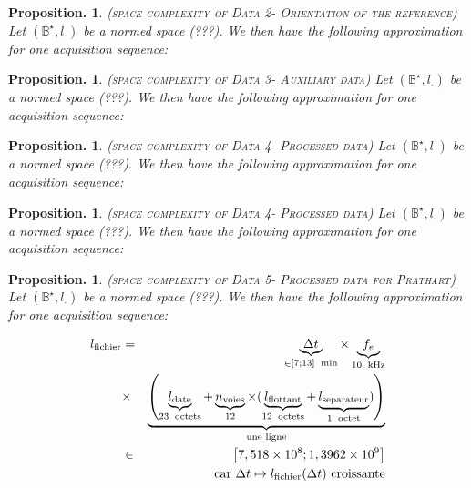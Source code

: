 \documentclass[twocolumn,pre,floats,aps,amsmath,amssymb]{revtex4}
\newtheorem{proposition}[theorem]{Proposition.}
\begin{document}
\begin{proposition}
  (\textsc{space complexity of Data 2- Orientation of the reference})
  Let $(\mathbb{B}^{\star}, l_{\cdot})$ be a normed space (???). We then have the following approximation for one acquisition sequence:
\end{proposition}

\begin{proposition}
  (\textsc{space complexity of Data 3- Auxiliary data})
  Let $(\mathbb{B}^{\star}, l_{\cdot})$ be a normed space (???). We then have the following approximation for one acquisition sequence:
\end{proposition}

\begin{proposition}
  (\textsc{space complexity of Data 4- Processed data})
  Let $(\mathbb{B}^{\star}, l_{\cdot})$ be a normed space (???). We then have the following approximation for one acquisition sequence:
\end{proposition}

\begin{proposition}
  (\textsc{space complexity of Data 4- Processed data})
  Let $(\mathbb{B}^{\star}, l_{\cdot})$ be a normed space (???). We then have the following approximation for one acquisition sequence:
\end{proposition}

\begin{proposition}
  (\textsc{space complexity of Data 5- Processed data for Prathart})
  Let $(\mathbb{B}^{\star}, l_{\cdot})$ be a normed space (???). We then have the following approximation for one acquisition sequence:
\end{proposition}


  \begin{eqnarray}
    l_{\textup{fichier}} &=& \underbrace{\Delta t}_{\in \left [ 7 ; 13 \right ] \ \operatorname{min}} \times \underbrace{f_e}_{10 \ \operatorname{kHz}} \nonumber\\
                    &\times& \underbrace{\left (\underbrace{l_{\textup{date}}}_{23 \ \operatorname{octets}} + \underbrace{n_{\textup{voies}}}_{12} \times (\underbrace{l_{\textup{flottant}}}_{12 \ \operatorname{octets}} + \underbrace{l_{\textup{separateur}}}_{1 \ \operatorname{octet}} ) \right )}_{\textup{une ligne}}\\
                    &\in& \left [ 7,518 \times 10^8 ; 1,3962 \times 10^9 \right ] \\
                    &\ &  \textup{car } \Delta t \mapsto l_{\textup{fichier}} (\Delta t) \ \textup{croissante} \nonumber
  \end{eqnarray}
\end{document}
